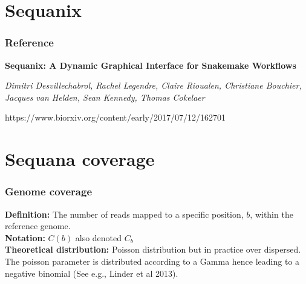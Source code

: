 \documentclass{beamer}
\begin{document}
\section{Sequanix}


\begin{frame}
\frametitle{Reference} 
 
\textbf{Sequanix: A Dynamic Graphical Interface for Snakemake Workflows} 

\vspace{.5cm}

\textit{Dimitri Desvillechabrol, Rachel Legendre, Claire Rioualen, Christiane 
Bouchier, Jacques van Helden, Sean Kennedy, Thomas Cokelaer}

\vspace{.5cm}
 
https://www.biorxiv.org/content/early/2017/07/12/162701
 
\end{frame}


 
\section{Sequana coverage}


\begin{frame}
\frametitle{Genome coverage}

\textbf{Definition:} The number of reads mapped to a specific position, $b$, 
within the reference genome. \\
\vspace{1em}
\textbf{Notation:} $ C(b)$ also denoted $C_b$\\
\vspace{1em}
\textbf{Theoretical distribution:} Poisson distribution but in practice over 
dispersed. The poisson parameter is distributed according to a Gamma hence 
leading to a negative binomial (See e.g., Linder et al 2013).
\end{frame}
\end{document}
